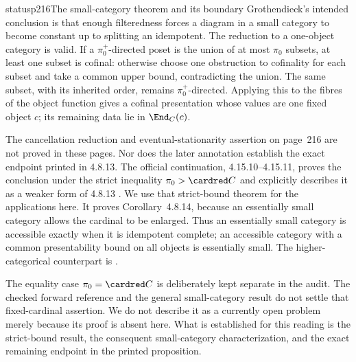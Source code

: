 \begin{dcomment}{status}{p216}{The small-category theorem and its boundary}
Grothendieck's intended conclusion is that enough filteredness forces a diagram in a small category to become constant up to splitting an idempotent. The reduction to a one-object category is valid. If a $\pi_0^+$-directed poset is the union of at most $\pi_0$ subsets, at least one subset is cofinal: otherwise choose one obstruction to cofinality for each subset and take a common upper bound, contradicting the union. The same subset, with its inherited order, remains $\pi_0^+$-directed. Applying this to the fibres of the object function gives a cofinal presentation whose values are one fixed object $c$; its remaining data lie in $\End_C(c)$.

The cancellation reduction and eventual-stationarity assertion on page~216 are not proved in these pages. Nor does the later annotation establish the exact endpoint printed in 4.8.13. The official continuation, 4.15.10--4.15.11, proves the conclusion under the strict inequality $\pi_0>\cardred C$ and explicitly describes it as a weaker form of 4.8.13 \citep{Grothendieck1990XVIII}. We use that strict-bound theorem for the applications here. It proves Corollary~4.8.14, because an essentially small category allows the cardinal to be enlarged. Thus an essentially small category is accessible exactly when it is idempotent complete; an accessible category with a common presentability bound on all objects is essentially small. The higher-categorical counterpart is \citet[Corollaries~5.4.3.5--5.4.3.6]{Lurie2009HTT}.

The equality case $\pi_0=\cardred C$ is deliberately kept separate in the audit. The checked forward reference and the general small-category result do not settle that fixed-cardinal assertion. We do not describe it as a currently open problem merely because its proof is absent here. What is established for this reading is the strict-bound result, the consequent small-category characterization, and the exact remaining endpoint in the printed proposition.
\end{dcomment}

